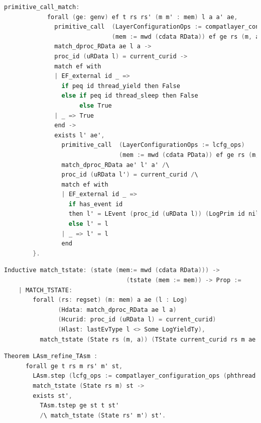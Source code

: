 \begin{lstlisting}[language=C]
          primitive_call_match:
            forall (ge: genv) ef t rs rs' (m m' : mem) l a a' ae,
              primitive_call  (LayerConfigurationOps := compatlayer_configuration_ops (phthread <@$\oplus$@> L64))
                              (mem := mwd (cdata RData)) ef ge rs (m, a) t rs' (m', a') ->
              match_dproc_RData ae l a ->
              proc_id (uRData l) = current_curid ->
              match ef with
              | EF_external id _ => 
                if peq id thread_yield then False
                else if peq id thread_sleep then False
                     else True
              | _ => True
              end -> 
              exists l' ae',
                primitive_call  (LayerConfigurationOps := lcfg_ops) 
                                (mem := mwd (cdata PData)) ef ge rs (m, (uRData l, ae)) t rs' (m', (uRData l', ae')) /\
                match_dproc_RData ae' l' a' /\
                proc_id (uRData l') = current_curid /\
                match ef with
                | EF_external id _ => 
                  if has_event id
                  then l' = LEvent (proc_id (uRData l)) (LogPrim id nil 0 (snap_func ae)) :: l
                  else l' = l
                | _ => l' = l
                end
        }.
\end{lstlisting}

\begin{lstlisting}[language=C]
    Inductive match_tstate: (state (mem:= mwd (cdata RData))) -> 
                                  (tstate (mem := mem)) -> Prop :=
    | MATCH_TSTATE:
        forall (rs: regset) (m: mem) a ae (l : Log)
               (Hdata: match_dproc_RData ae l a)
               (Hcurid: proc_id (uRData l) = current_curid)
               (Hlast: lastEvType l <> Some LogYieldTy),
          match_tstate (State rs (m, a)) (TState current_curid rs m ae l).
\end{lstlisting}

\begin{lstlisting}[language=C]
    Theorem LAsm_refine_TAsm :
      forall ge t rs m rs' m' st, 
        LAsm.step (lcfg_ops := compatlayer_configuration_ops (phthread <@$\oplus$@> L64)) ge (State rs m) t (State rs' m') ->
        match_tstate (State rs m) st ->
        exists st',        
          TAsm.tstep ge st t st'
          /\ match_tstate (State rs' m') st'.
\end{lstlisting}

